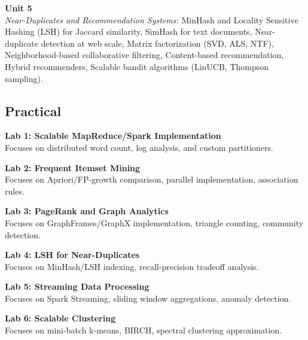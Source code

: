 \vspace{0.3cm}

\noindent\textbf{Unit 5} \\
\textit{Near-Duplicates and Recommendation Systems:} MinHash and Locality Sensitive Hashing (LSH) for Jaccard similarity, SimHash for text documents, Near-duplicate detection at web scale, Matrix factorization (SVD, ALS, NTF), Neighborhood-based collaborative filtering, Content-based recommendation, Hybrid recommenders, Scalable bandit algorithms (LinUCB, Thompson sampling).

\newpage

\subsection*{Practical}
\noindent\textbf{Lab 1: Scalable MapReduce/Spark Implementation} \\
Focuses on distributed word count, log analysis, and custom partitioners.

\vspace{0.2cm}

\noindent\textbf{Lab 2: Frequent Itemset Mining} \\
Focuses on Apriori/FP-growth comparison, parallel implementation, association rules.

\vspace{0.2cm}

\noindent\textbf{Lab 3: PageRank and Graph Analytics} \\
Focuses on GraphFrames/GraphX implementation, triangle counting, community detection.

\vspace{0.2cm}

\noindent\textbf{Lab 4: LSH for Near-Duplicates} \\
Focuses on MinHash/LSH indexing, recall-precision tradeoff analysis.

\vspace{0.2cm}

\noindent\textbf{Lab 5: Streaming Data Processing} \\
Focuses on Spark Streaming, sliding window aggregations, anomaly detection.

\vspace{0.2cm}

\noindent\textbf{Lab 6: Scalable Clustering} \\
Focuses on mini-batch k-means, BIRCH, spectral clustering approximation.

\vspace{0.2cm}

